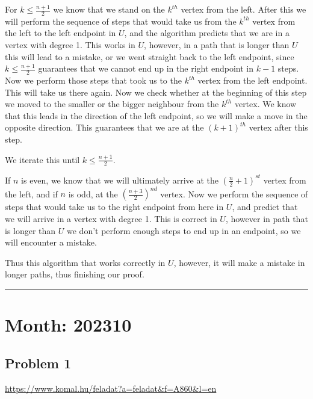 \documentclass{article}
\begin{document}
For \(\displaystyle k\le \frac{n+1}{2}\) we know that we stand on the \(\displaystyle k^{th}\) vertex from the left. After this we will perform the sequence of steps that would take us from the \(\displaystyle k^{th}\) vertex from the left to the left endpoint in \(\displaystyle U\), and the algorithm predicts that we are in a vertex with degree 1. This works in \(\displaystyle U\), however, in a path that is longer than \(\displaystyle U\) this will lead to a mistake, or we went straight back to the left endpoint, since \(\displaystyle k\le \frac{n+1}{2}\) guarantees that we cannot end up in the right endpoint in \(\displaystyle k-1\) steps. Now we perform those steps that took us to the \(\displaystyle k^{th}\) vertex from the left endpoint. This will take us there again. Now we check whether at the beginning of this step we moved to the smaller or the bigger neighbour from the \(\displaystyle k^{th}\) vertex. We know that this leads in the direction of the left endpoint, so we will make a move in the opposite direction. This guarantees that we are at the \(\displaystyle (k+1)^{th}\) vertex after this step.

We iterate this until \(\displaystyle k\le \frac{n+1}{2}\).

If \(\displaystyle n\) is even, we know that we will ultimately arrive at the \(\displaystyle \left(\frac{n}{2}+1\right)^{st}\) vertex from the left, and if \(\displaystyle n\) is odd, at the \(\displaystyle \left(\frac{n+3}{2}\right)^{nd}\) vertex. Now we perform the sequence of steps that would take us to the right endpoint from here in \(\displaystyle U\), and predict that we will arrive in a vertex with degree 1. This is correct in \(\displaystyle U\), however in path that is longer than \(\displaystyle U\) we don't perform enough steps to end up in an endpoint, so we will encounter a mistake.

Thus this algorithm that works correctly in \(\displaystyle U\), however, it will make a mistake in longer paths, thus finishing our proof.

\vspace{1em}
\hrule
\vspace{1em}

\section*{Month: 202310}

\subsection*{Problem 1}
\noindent\url{https://www.komal.hu/feladat?a=feladat&f=A860&l=en}\\[1em]
\end{document}
